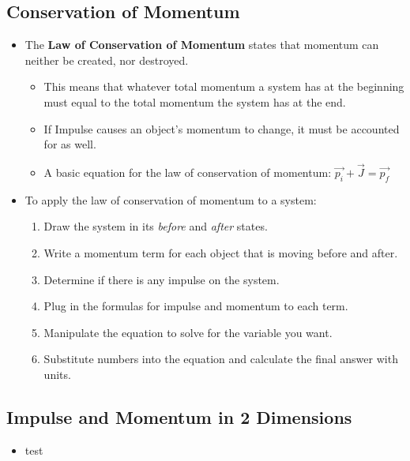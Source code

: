 \documentclass[letterpaper, 12pt]{article}
\begin{document}
\subsection*{Conservation of Momentum}
\begin{itemize}
	\item The \textbf{Law of Conservation of Momentum} states that momentum can neither be created, nor destroyed. 
	\begin{itemize}
		\item This means that whatever total momentum a system has at the beginning must equal to the total momentum the system has at the end. 
		\item If Impulse causes an object's momentum to change, it must be accounted for as well.  
		\item A basic equation for the law of conservation of momentum: $\vec{p_i} + \vec{J} = \vec{p_f} $
	\end{itemize}
	\item To apply the law of conservation of momentum to a system:
		\begin{enumerate}
			\item Draw the system in its \textit{before} and \textit{after} states.  
			\item Write a momentum term for each object that is moving before and after.
			\item Determine if there is any impulse on the system.
			\item Plug in the formulas for impulse and momentum to each term.
			\item Manipulate the equation to solve for the variable you want.
			\item Substitute numbers into the equation and calculate the final answer with units. 
		\end{enumerate}
\end{itemize}

	
\subsection*{Impulse and Momentum in 2 Dimensions}
\begin{itemize}

	\item test
\end{itemize}

 
\end{document}
